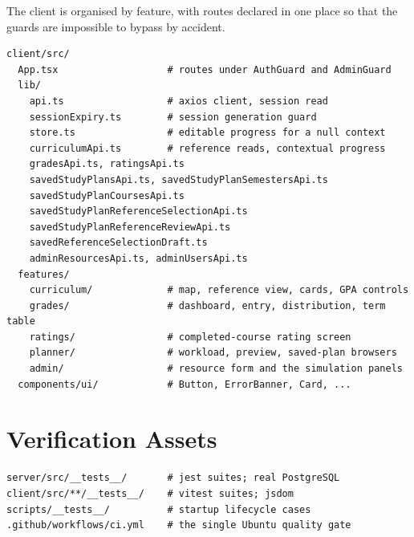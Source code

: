 The client is organised by feature, with routes declared in one place so that the guards are
impossible to bypass by accident.

\begin{lstlisting}
client/src/
  App.tsx                   # routes under AuthGuard and AdminGuard
  lib/
    api.ts                  # axios client, session read
    sessionExpiry.ts        # session generation guard
    store.ts                # editable progress for a null context
    curriculumApi.ts        # reference reads, contextual progress
    gradesApi.ts, ratingsApi.ts
    savedStudyPlansApi.ts, savedStudyPlanSemestersApi.ts
    savedStudyPlanCoursesApi.ts
    savedStudyPlanReferenceSelectionApi.ts
    savedStudyPlanReferenceReviewApi.ts
    savedReferenceSelectionDraft.ts
    adminResourcesApi.ts, adminUsersApi.ts
  features/
    curriculum/             # map, reference view, cards, GPA controls
    grades/                 # dashboard, entry, distribution, term table
    ratings/                # completed-course rating screen
    planner/                # workload, preview, saved-plan browsers
    admin/                  # resource form and the simulation panels
  components/ui/            # Button, ErrorBanner, Card, ...
\end{lstlisting}

\section{Verification Assets}

\begin{lstlisting}
server/src/__tests__/       # jest suites; real PostgreSQL
client/src/**/__tests__/    # vitest suites; jsdom
scripts/__tests__/          # startup lifecycle cases
.github/workflows/ci.yml    # the single Ubuntu quality gate
\end{lstlisting}
